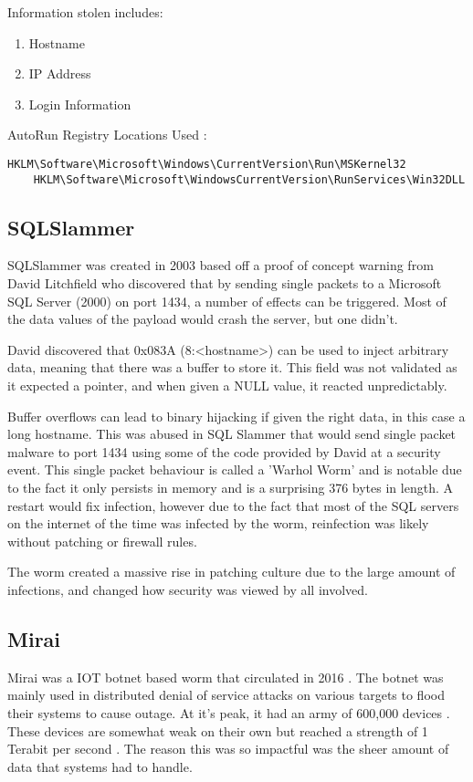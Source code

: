Information stolen includes:
\begin{enumerate}
    \item Hostname
    \item IP Address
    \item Login Information
\end{enumerate}

AutoRun Registry Locations Used \citep{Loveletter}:
\begin{lstlisting}[label=AutoRunILY,caption=Targeted Registry Hives]
    HKLM\Software\Microsoft\Windows\CurrentVersion\Run\MSKernel32 
    HKLM\Software\Microsoft\WindowsCurrentVersion\RunServices\Win32DLL 
\end{lstlisting}

\subsection{SQLSlammer}
SQLSlammer was created in 2003 based off a proof of concept warning from David Litchfield who discovered that by sending single packets to a Microsoft SQL Server (2000) on port 1434, a number of effects can be triggered.
Most of the data values of the payload would crash the server, but one didn't. \citep{SQLSlammerStory}

David discovered that 0x083A (8:<hostname>) can be used to inject arbitrary data, meaning that there was a buffer to store it. 
This field was not validated as it expected a pointer, and when given a NULL value, it reacted unpredictably.  \citep{SQLSlammerStory}

Buffer overflows can lead to binary hijacking if given the right data, in this case a long hostname. This was abused in SQL Slammer that would send single packet malware to port 1434 using some of the code provided by David at a security event.
This single packet behaviour is called a 'Warhol Worm' and is notable due to the fact it only persists in memory and is a surprising 376 bytes in length. \citep{SQLSlammer} A restart would fix infection, however due to the fact that most of the SQL servers on the internet of the time was infected by the worm,
reinfection was likely without patching or firewall rules.

The worm created a massive rise in patching culture due to the large amount of infections, and changed how security was viewed by all involved. \citep{SQLSlammerStory}

\subsection{Mirai}
Mirai was a IOT botnet based worm that circulated in 2016 \citep{Mirai}. The botnet was mainly used in distributed denial of service attacks on various targets to flood their systems to cause outage. At it's peak, it
had an army of 600,000 devices \citep{Mirai}. These devices are somewhat weak on their own but reached a strength of 1 Terabit per second \citep{Mirai}. The reason this was so impactful was the sheer amount of data that systems had to handle.


